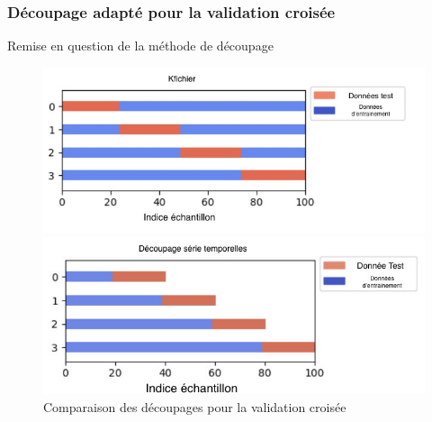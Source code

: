 \documentclass{beamer}
\begin{document}
\begin{frame}
	\frametitle{Découpage adapté pour la validation croisée}
		Remise en question de la méthode de découpage
		\begin{figure}[h]
			\centering
			\begin{minipage}{0.5\textwidth}
				\includegraphics[scale=0.3]{kfold}
			\end{minipage}
			\centering
			\begin{minipage}{0.5\textwidth}
				\includegraphics[scale=0.3]{tscv}
			\end{minipage}
		\caption{Comparaison des découpages pour la validation croisée}
		\end{figure}
\end{frame}
\end{document}
